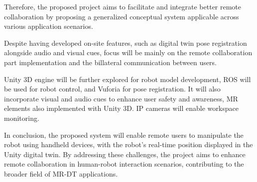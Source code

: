 Therefore, the proposed project aims to facilitate and integrate better remote collaboration by proposing a generalized conceptual system applicable across various application scenarios.

Despite having developed on-site features, such as digital twin pose registration alongside audio and visual cues, focus will be mainly on the remote collaboration part implementation and the billateral communication between users.

Unity 3D engine will be further explored for robot model development, \ac{ROS} will be used for robot control, and Vuforia for pose registration. It will also incorporate visual and audio cues to enhance user safety and awareness, \ac{MR} elements also implemented with Unity 3D. IP cameras will enable workspace monitoring. 

In conclusion, the proposed system will enable remote users to manipulate the robot using handheld devices, with the robot's real-time position displayed in the Unity digital twin. By addressing these challenges, the project aims to enhance remote collaboration in human-robot interaction scenarios, contributing to the broader field of \ac{MR}-\ac{DT} applications.







